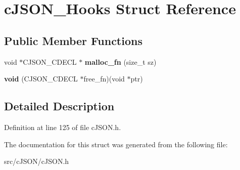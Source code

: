 \hypertarget{structc_j_s_o_n___hooks}{}\section{c\+J\+S\+O\+N\+\_\+\+Hooks Struct Reference}
\label{structc_j_s_o_n___hooks}
\subsection*{Public Member Functions}
\begin{DoxyCompactItemize}
\item 
\mbox{\label{structc_j_s_o_n___hooks_a71693d8b277a80a1faf8758b9589d670}} 
void $\ast$C\+J\+S\+O\+N\+\_\+\+C\+D\+E\+CL $\ast$ {\bfseries malloc\+\_\+fn} (size\+\_\+t sz)
\item 
\mbox{\label{structc_j_s_o_n___hooks_a42c96b388103ffb466e7335b9fc710c3}} 
{\bfseries void} (C\+J\+S\+O\+N\+\_\+\+C\+D\+E\+CL $\ast$free\+\_\+fn)(void $\ast$ptr)
\end{DoxyCompactItemize}


\subsection{Detailed Description}


Definition at line 125 of file c\+J\+S\+O\+N.\+h.



The documentation for this struct was generated from the following file\+:\begin{DoxyCompactItemize}
\item 
src/c\+J\+S\+O\+N/c\+J\+S\+O\+N.\+h\end{DoxyCompactItemize}
